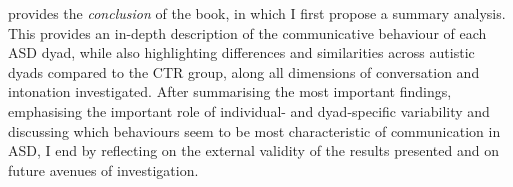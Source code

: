 	 provides the \emph{conclusion} of the book, in which I first propose a summary analysis. This provides an in-depth description of the communicative behaviour of each ASD dyad, while also highlighting differences and similarities across autistic dyads compared to the CTR group, along all dimensions of conversation and intonation investigated. After summarising the most important findings, emphasising the important role of individual- and dyad-specific variability and discussing which behaviours seem to be most characteristic of communication in ASD, I end by reflecting on the external validity of the results presented and on future avenues of investigation.
